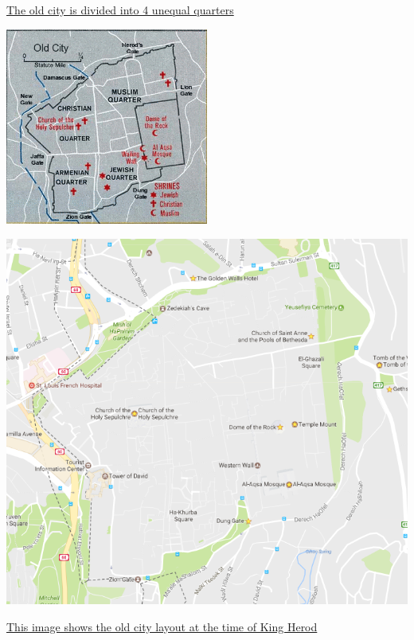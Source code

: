 \documentclass[letterpaper]{report}
\begin{document}
\href{http://wikitravel.org/en/Jerusalem/Old_City}{
	The old city is divided into 4 unequal quarters}

\includegraphics[width=0.5\textwidth]{MapJerusalemOldCity}

\includegraphics[width=\textwidth]{OldJerusalem}

\href{http://www.jesus-story.net/maps_jesus.htm}{
	This image shows the old city layout at the time of King Herod}
\end{document}
